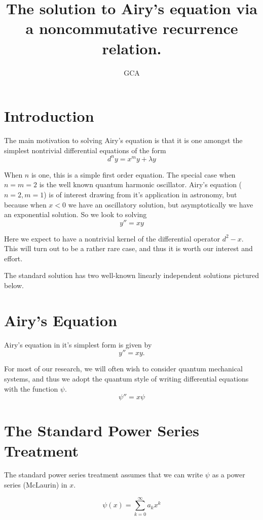 \documentclass{amsart}
\title{The solution to Airy's equation via a noncommutative recurrence relation.}
\author{GCA}
\theoremstyle{definition}
\theoremstyle{remark}
\numberwithin{equation}{section}
\begin{document}
\maketitle


\section{Introduction}

The main motivation to solving Airy's equation is that it is one amongst the simplest nontrivial differential equations of the form
\[
d^n y = x^m y + \lambda y
\]

When $n$ is one, this is a simple first order equation.  The special case when $n=m=2$ is the well known quantum harmonic oscillator.  Airy's equation ($n=2,m=1$) is of interest drawing from it's application in astronomy, but because when $x<0$ we have an oscillatory solution, but asymptotically we have an exponential solution.  So we look to solving
\[
y'' = xy
\]

Here we expect to have a nontrivial kernel of the differential operator $d^2 - x$.  This will turn out to be a rather rare case, and thus it is worth our interest and effort.

The standard solution has two well-known linearly independent solutions pictured below.



\section{Airy's Equation}

Airy's equation in it's simplest form is given by
\[
y'' = xy.
\]


For most of our research, we will often wish to consider quantum mechanical systems, and thus we adopt the quantum style of writing differential equations with the function $\psi$.
\[
\psi'' = x\psi
\]





\section{The Standard Power Series Treatment}


The standard power series treatment assumes that we can write $\psi$ as a power series (McLaurin) in $x$.

\[
\psi(x) = \sum_{k=0}^{\infty} a_k x^k
\]
\end{document}
